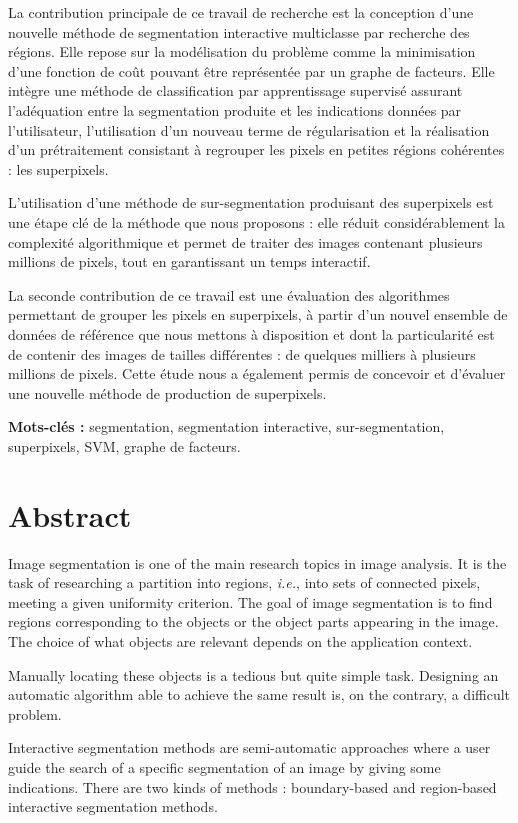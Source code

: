 La contribution principale de ce travail de recherche est la conception d'une nouvelle méthode de segmentation  interactive multiclasse par recherche des régions. Elle repose sur la modélisation du problème comme la minimisation d'une fonction de coût pouvant être représentée par un graphe de facteurs. Elle intègre une méthode de classification par apprentissage supervisé assurant l'adéquation entre la segmentation produite et les indications données par l'utilisateur, l'utilisation d'un nouveau terme de régularisation et la réalisation d'un prétraitement consistant à regrouper les pixels en petites régions cohérentes : les superpixels. 

L'utilisation d'une méthode de sur-segmentation produisant des superpixels est une étape clé de la méthode que nous proposons : elle réduit considérablement la complexité algorithmique et permet de traiter des images contenant plusieurs millions de pixels, tout en garantissant un temps interactif.

La seconde contribution de ce travail est une évaluation des algorithmes permettant de grouper les pixels en superpixels, à partir d'un nouvel ensemble de données de référence que nous mettons  à disposition et dont la particularité est de contenir des images de tailles différentes : de quelques milliers à plusieurs millions de pixels. Cette étude nous a également permis de concevoir et d'évaluer une nouvelle méthode de production de superpixels. 

\textbf{Mots-clés :} segmentation, segmentation interactive, sur-segmentation, superpixels, SVM, graphe de facteurs.


\chapter*{Abstract}
Image segmentation is one of the main research topics in image analysis. It is the task of researching a partition into regions,\textit{ i.e.}, into sets of connected pixels, meeting a given uniformity criterion. The goal  of image segmentation is to find regions corresponding to the objects or the object parts appearing in the image. The choice of what objects are relevant depends on the application context. 

Manually locating these objects is a tedious but quite simple task. Designing an automatic algorithm able to achieve the same result is, on the contrary, a difficult problem.

Interactive segmentation methods are semi-automatic approaches where a user guide the search of a specific segmentation of an image by giving some indications. There are two kinds of methods : boundary-based and region-based interactive segmentation methods.
 
